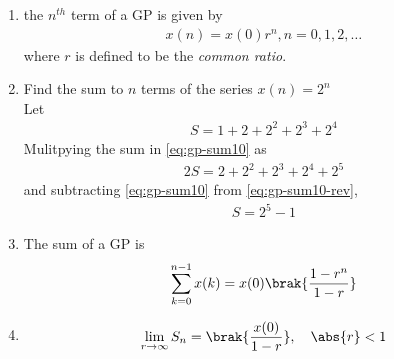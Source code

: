 \begin{enumerate}[label=\thesubsection.\arabic*,ref=\thesubsection.\theenumi]
	\item the $n^{th}$ term of a GP is given by 
\begin{align}
	\label{eq:gp-nthterm}
	x(n)= x(0)r^n, n = 0,1,2, \dots 
\end{align}
where $r$
		is defined to be the {\em common ratio}.
\item Find the sum to $n$ terms of the series
$x(n) = 2^n$
	\\
	\solution
	Let
\begin{align}
	\label{eq:gp-sum10}
	S = 1 + 2 + 2^2 + 2^3 + 2^4
\end{align}
Mulitpying the sum in
	\eqref{eq:gp-sum10}
	as
\begin{align}
	\label{eq:gp-sum10-rev}
	2S =  2 + 2^2 + 2^3 + 2^4+ 2^5
\end{align}
and  subtracting
	\eqref{eq:gp-sum10}
	from
	\eqref{eq:gp-sum10-rev},
\begin{align}
	\label{eq:gp-sum10-add}
	S = 2^5 - 1
\end{align}
\item The sum of a GP is 
\begin{align}
	 \sum_{k=0}^{n-1}x(k)  
	= x(0)\brak{\frac{1-r^{n}}{1-r}}
	\label{eq:gp-sumn}
\end{align}
\item 
\begin{align}
	\lim_{r\to\infty}	S_n = 
	 \brak{\frac{x(0)}{1-r}},\quad \abs{r} < 1
	\label{eq:gp-sumn-infty}
\end{align}
\end{enumerate}
